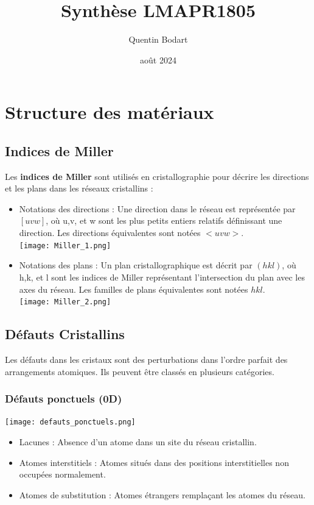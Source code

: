\documentclass{article}
\title{Synthèse LMAPR1805}
\author{Quentin Bodart}
\date{août 2024}
\begin{document}
\maketitle
\tableofcontents
\pagebreak
\section{Structure des matériaux}
    \subsection{Indices de Miller}
    Les \textbf{indices de Miller} sont utilisés en cristallographie pour décrire les directions et les plans dans les réseaux cristallins :
    \begin{itemize}
        \item Notations des directions : Une direction dans le réseau est représentée par $[uvw]$, où u,v, et w sont les plus petits entiers relatifs définissant une direction. Les directions équivalentes sont notées $<uvw>$.\\
        \texttt{[image: Miller\_1.png]}
        \item Notations des plans : Un plan cristallographique est décrit par $(hkl)$, où h,k, et l sont les indices de Miller représentant l'intersection du plan avec les axes du réseau. Les familles de plans équivalentes sont notées ${hkl}$. \\
        \texttt{[image: Miller\_2.png]}
    \end{itemize}
    \pagebreak
    \subsection{Défauts Cristallins}
    Les défauts dans les cristaux sont des perturbations dans l'ordre parfait des arrangements atomiques. Ils peuvent être classés en plusieurs catégories.
    
        \subsubsection{Défauts ponctuels (0D)}
        \texttt{[image: defauts\_ponctuels.png]}
        \begin{itemize}
            \item Lacunes : Absence d'un atome dans un site du réseau cristallin. 
            \item Atomes interstitiels : Atomes situés dans des positions interstitielles non occupées normalement. 
            \item Atomes de substitution : Atomes étrangers remplaçant les atomes du réseau.
        \end{itemize}
        
\end{document}
